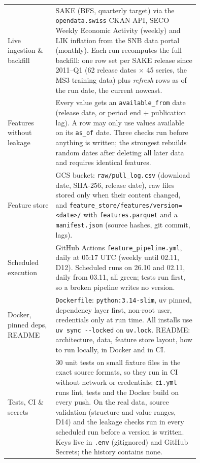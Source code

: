 \documentclass[11pt,a4paper]{article}
\newcommand{\file}[1]{\texttt{#1}}
\begin{document}
	\begingroup
	\small
	\renewcommand{\arraystretch}{1.0}
	\begin{longtable}{L p{0.75\linewidth}}
		\toprule
		Live ingestion \& backfill & SAKE (BFS, quarterly target) via the \texttt{opendata.swiss} CKAN API, SECO Weekly
		Economic Activity (weekly) and LIK inflation from the SNB data portal (monthly). Each run recomputes the full backfill:
		one row set per SAKE release since 2011--Q1 (62 release dates $\times$ 45 series, the MS3 training data) plus
		\emph{refresh} rows as of the run date, the current nowcast. \\
		Features without leakage & Every value gets an \texttt{available\_from} date (release date, or period end +
		publication lag). A row may only use values available on its \texttt{as\_of} date. Three checks run before anything
		is written; the strongest rebuilds random dates after deleting all later data and requires identical features. \\
		Feature store & GCS bucket: \file{raw/pull\_log.csv} (download date, SHA-256, release date), raw files stored only
		when their content changed, and \file{feature\_store/features/version=<date>/} with \file{features.parquet} and a
		\file{manifest.json} (source hashes, git commit, lags). \\
		Scheduled execution & GitHub Actions \file{feature\_pipeline.yml}, daily at 05:17 UTC (weekly until 02.11, D12).
		Scheduled runs on 26.10 and 02.11, daily from 03.11, all green; tests run first, so a broken pipeline writes no
		version. \\
		Docker, pinned deps, README & \file{Dockerfile}: \texttt{python:3.14-slim}, uv pinned, dependency layer first,
		non-root user, credentials only at run time. All installs use \texttt{uv sync -{}-locked} on \file{uv.lock}. README:
		architecture, data, feature store layout, how to run locally, in Docker and in CI. \\
		Tests, CI \& secrets & 30 unit tests on small fixture files in the exact source formats, so they run in CI without
		network or credentials; \file{ci.yml} runs lint, tests and the Docker build on every push. On the real data, source
		validation (structure and value ranges, D14) and the leakage checks run in every scheduled run before a version is written. Keys live in \file{.env}
		(gitignored) and GitHub Secrets; the history contains none. \\
		\bottomrule
	\end{longtable}
	\endgroup
	
	\vspace{-0.8em}
\end{document}
